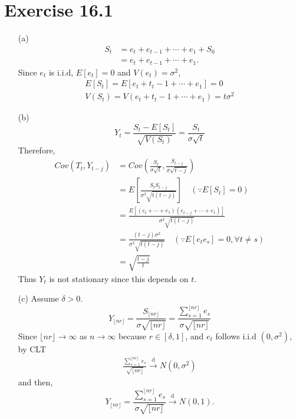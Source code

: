 \documentclass{article}
\begin{document}
\section{Exercise 16.1}

\begin{itemize}
  \item[(a) ] 
  \begin{align*}
    S_t &= e_t + e_{t-1} + \cdots + e_1 + S_0 \\
    & = e_t + e_{t-1} + \cdots + e_1.
  \end{align*}
  Since $e_t$ is i.i.d, $E[e_t]=0$ and $V(e_t)=\sigma^2$,
  \begin{align*}
      E[S_t]=E[e_t+t_t-1+\cdots+e_1]=0\\
      V(S_t)=V(e_t+t_t-1+\cdots+e_1)=t\sigma^2
  \end{align*}

  \item[(b) ] 
  \begin{equation*}
      Y_t = \frac{S_t-E[S_t]}{\sqrt{V(S_t)}}=\frac{S_t}{\sigma\sqrt{t}}
  \end{equation*}
  Therefore,
  \begin{align*}
      Cov(T_t,Y_{t-j}) &= Cov(\frac{S_t}{\sigma\sqrt{t}},\frac{S_{t-j}}{\sigma\sqrt{t-j}})\\
      &= E[\frac{S_tS_{t-j}}{\sigma^2\sqrt{t(t-j)}}] \quad (\because E[S_t]=0)\\
      &= \frac{E[(e_t+\cdots+e_1)(e_{t-j}+\cdots+e_1)]}{\sigma^2\sqrt{t(t-j)}} \\
      &= \frac{(t-j)\sigma^2}{\sigma^2\sqrt{t(t-j)}} \quad (\because E[e_te_s]=0,  \forall t\neq s) \\
      &= \sqrt{\frac{t-j}{t}}
  \end{align*}
  Thus $Y_t$ is not stationary since this depends on $t$.
  
  \item[(c) ] Assume $\delta>0$.
  \begin{equation*}
      Y_{\lfloor nr \rfloor}=\frac{S_{\lfloor nr\rfloor}}{\sigma\sqrt{\lfloor nr\rfloor}}=\frac{\sum^{\lfloor nr\rfloor}_{s=1}e_s}{\sigma\sqrt{\lfloor nr\rfloor}}
  \end{equation*}
  Since $\lfloor nr\rfloor\rightarrow \infty$ as $n\rightarrow\infty$ because $r\in[\delta,1]$, and $e_t$ follows i.i.d $(0,\sigma^2)$,
  by CLT
  \begin{align*}
      \frac{\sum^{\lfloor nr\rfloor}_{s=1}e_s}{\sqrt{\lfloor nr\rfloor}}\xrightarrow{\mathrm{d}} N(0,\sigma^2)
  \end{align*}
  and then,
  \begin{equation*}
      Y_{\lfloor nr\rfloor}=\frac{\sum^{\lfloor nr\rfloor}_{s=1}e_s}{\sigma\sqrt{\lfloor nr\rfloor}}\xrightarrow{\mathrm{d}}N(0,1).
  \end{equation*}
\end{itemize}
\end{document}
